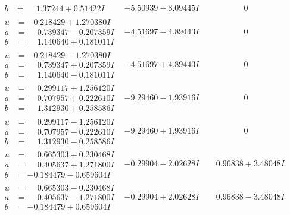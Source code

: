 \documentclass[1p]{elsarticle_modified}
\theoremstyle{definition}
\begin{document}
$$\begin{array}{c|c|c}
\begin{aligned}
b &= \phantom{-}1.37244 + 0.51422 I\end{aligned}
 & -5.50939 - 8.09445 I & \phantom{-0.000000 } 0 \\ \hline\begin{aligned}
u &= -0.218429 + 1.270380 I \\
a &= \phantom{-}0.739347 - 0.207359 I \\
b &= \phantom{-}1.140640 + 0.181011 I\end{aligned}
 & -4.51697 - 4.89443 I & \phantom{-0.000000 } 0 \\ \hline\begin{aligned}
u &= -0.218429 - 1.270380 I \\
a &= \phantom{-}0.739347 + 0.207359 I \\
b &= \phantom{-}1.140640 - 0.181011 I\end{aligned}
 & -4.51697 + 4.89443 I & \phantom{-0.000000 } 0 \\ \hline\begin{aligned}
u &= \phantom{-}0.299117 + 1.256120 I \\
a &= \phantom{-}0.707957 + 0.222610 I \\
b &= \phantom{-}1.312930 + 0.258586 I\end{aligned}
 & -9.29460 - 1.93916 I & \phantom{-0.000000 } 0 \\ \hline\begin{aligned}
u &= \phantom{-}0.299117 - 1.256120 I \\
a &= \phantom{-}0.707957 - 0.222610 I \\
b &= \phantom{-}1.312930 - 0.258586 I\end{aligned}
 & -9.29460 + 1.93916 I & \phantom{-0.000000 } 0 \\ \hline\begin{aligned}
u &= \phantom{-}0.665303 + 0.230468 I \\
a &= \phantom{-}0.405637 + 1.271800 I \\
b &= -0.184479 - 0.659604 I\end{aligned}
 & -0.29904 - 2.02628 I & \phantom{-}0.96838 + 3.48048 I \\ \hline\begin{aligned}
u &= \phantom{-}0.665303 - 0.230468 I \\
a &= \phantom{-}0.405637 - 1.271800 I \\
b &= -0.184479 + 0.659604 I\end{aligned}
 & -0.29904 + 2.02628 I & \phantom{-}0.96838 - 3.48048 I \\ \hline\begin{aligned}

\end{aligned}
\end{array}$$
\end{document}
